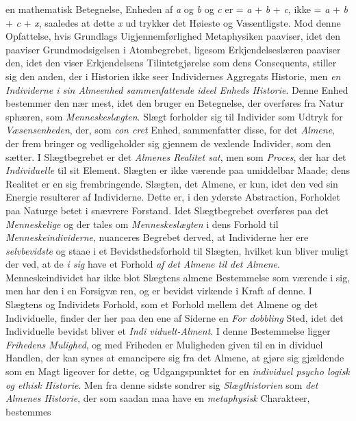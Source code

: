 en mathematisk Betegnelse, Enheden af \textit{a} og \textit{b} og \textit{c} er = \textit{a}
+ \textit{b} + \textit{c}, ikke = \textit{a} + \textit{b} + \textit{c} + \textit{x}, saaledes at dette \textit{x} ud\-%
trykker det Høieste og Væsentligste. Mod denne Opfattelse,
hvis Grundlags Uigjennemførlighed Metaphysiken paaviser,
idet den paaviser Grundmodsigelsen i Atombegrebet, ligesom
Erkjendelseslæren paaviser den, idet den viser Erkjendelsens
Tilintetgjørelse som dens Consequents, stiller sig den anden,
der i Historien ikke seer Individernes Aggregats Historie, men
\emph{en Individerne i sin Almeenhed sammenfattende
ideel Enheds Historie}. Denne Enhed bestemmer den nær\-%
mest, idet den bruger en Betegnelse, der overføres fra Natur\-%
sphæren, som \emph{Menneskeslægten}. Slægt forholder sig til
Individer som Udtryk for \emph{Væsensenheden}, der, som \emph{con\-%
cret} Enhed, sammenfatter disse, for det \emph{Almene}, der frem\-%
bringer og vedligeholder sig gjennem de vexlende Individer,
som den sætter. I Slægtbegrebet er det \emph{Almenes Realitet
sat}, men som \emph{Proces}, der har det \emph{Individuelle} til sit
Element. Slægten er ikke værende paa umiddelbar Maade;
dens Realitet er en sig frembringende. Slægten, det Almene,
er kun, idet den ved sin Energie resulterer af Individerne.
Dette er, i den yderste Abstraction, Forholdet paa Naturge\-%
betet i snævrere Forstand. Idet Slægtbegrebet overføres paa
det \emph{Menneskelige} og der tales om \emph{Menneskeslægten} i
dens Forhold til \emph{Menneskeindividerne}, nuanceres Begrebet
derved, at Individerne her ere \emph{selvbevidste} og staae i et
Bevidsthedsforhold til Slægten, hvilket kun bliver muligt der\-%
ved, at de \emph{i sig} have et Forhold \emph{af det Almene til det
Almene}. Menneskeindividet har ikke blot Slægtens almene
Bestemmelse som værende i sig, men har den i en Forsigvæ\-%
ren, og er bevidst virkende i Kraft af denne. I Slægtens og
 Individets Forhold, som et Forhold mellem det Almene og det
Individuelle, finder der her paa den ene af Siderne en \emph{For\-%
dobbling} Sted, idet det Individuelle bevidst bliver et \emph{Indi\-%
viduelt-Alment}. I denne Bestemmelse ligger \emph{Frihedens
Mulighed}, og med Friheden er Muligheden given til en in\-%
dividuel Handlen, der kan synes at emancipere sig fra det
Almene, at gjøre sig gjældende som en Magt ligeover\-%
for dette, og Udgangspunktet for en \emph{individuel psycho\-%
logisk og ethisk Historie}. Men fra denne sidste sondrer
sig \emph{Slægthistorien} som \emph{det Almenes Historie}, der som
saadan maa have en \emph{metaphysisk} Charakteer, bestemmes

